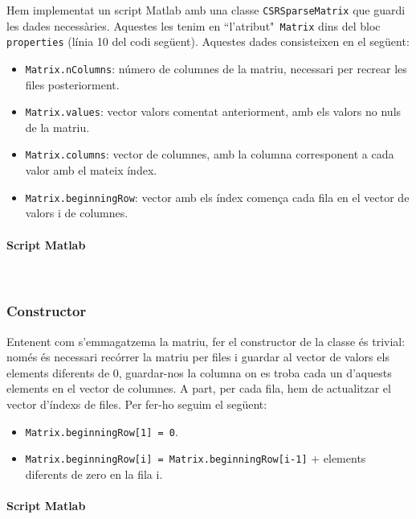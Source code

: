 \documentclass[11pt,a4paper,twoside]{report}
\begin{document}
	Hem implementat un script Matlab amb una classe \texttt{CSRSparseMatrix} que guardi les dades necessàries. Aquestes les tenim en ``l'atribut"\texttt{ Matrix} dins del bloc \texttt{properties} (línia 10 del codi següent). Aquestes dades consisteixen en el següent:	
	\begin{itemize}
	\item  \texttt{Matrix.nColumns}: número de columnes de la matriu, necessari per recrear les files posteriorment.
	\item  \texttt{Matrix.values}: vector valors comentat anteriorment, amb els valors no nuls de la matriu.
	\item  \texttt{Matrix.columns}: vector de columnes, amb la columna corresponent a cada valor amb el mateix índex.
	\item  \texttt{Matrix.beginningRow}: vector amb els índex comença cada fila en el vector de valors i de columnes.
	\end{itemize}
	
	\paragraph*{Script Matlab}\mbox{}\\
	
	
	
	\subsubsection{Constructor}
	\label{sec:Constructor}
	Entenent com s'emmagatzema la matriu, fer el constructor de la classe és trivial: només és necessari recórrer la matriu per files i guardar al vector de valors els elements diferents de 0, guardar-nos la columna on es troba cada un d'aquests elements en el vector de columnes. A part, per cada fila, hem de actualitzar el vector d'índexs de files. Per fer-ho seguim el següent:
	\begin{itemize}
	\item \texttt{Matrix.beginningRow[1] = 0}.
	\item \texttt{Matrix.beginningRow[i] = Matrix.beginningRow[i-1]} + elements diferents de zero en la fila i.
	\end{itemize}
	
	\paragraph*{Script Matlab} \mbox{} \\
	
\end{document}
